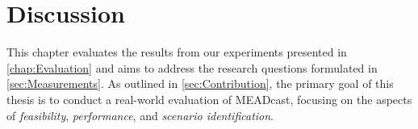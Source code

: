 \chapter{Discussion} %
\label{chap:Discussion}










This chapter evaluates the results from our experiments presented in
    \autoref{chap:Evaluation} and aims to address the research questions
    formulated in \autoref{sec:Measurements}.
As outlined in \autoref{sec:Contribution}, the primary goal of this thesis is
    to conduct a real-world evaluation of MEADcast, focusing on the aspects of
    \textit{feasibility}, \textit{performance}, and \textit{scenario
    identification}.

